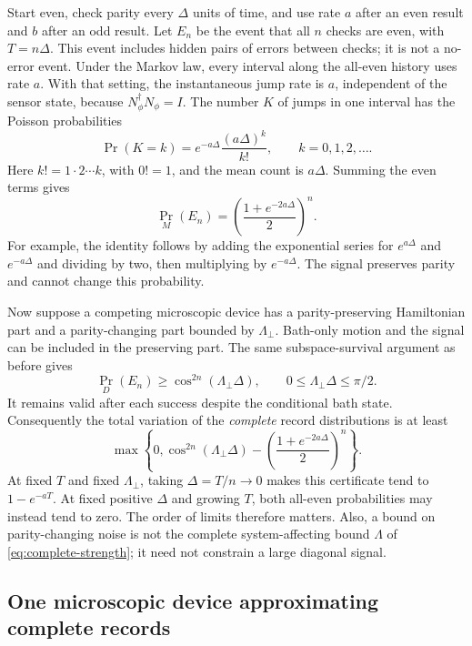 \documentclass[11pt,a4paper]{article}
\numberwithin{equation}{section}
\theoremstyle{remark}
\begin{document}
Start even, check parity every $\Delta$ units of time, and use rate $a$
after an even result and $b$ after an odd result. Let $E_n$ be the event that
all $n$ checks are even, with $T=n\Delta$. This event includes hidden pairs
of errors between checks; it is not a no-error event. Under the Markov law,
every interval along the all-even history uses rate $a$. With that
setting, the instantaneous jump rate is $a$, independent of the sensor state,
because $N_\phi^\dagger N_\phi=I$. The number $K$ of jumps in one
interval has the Poisson probabilities
\begin{equation}
 \Pr(K=k)=e^{-a\Delta}\frac{(a\Delta)^k}{k!},
 \qquad k=0,1,2,\ldots .
\end{equation}
Here $k!=1\cdot2\cdots k$, with $0!=1$, and the mean count is $a\Delta$.
Summing the even terms gives
\begin{equation}
 \Pr_M(E_n)=\left(\frac{1+e^{-2a\Delta}}2\right)^n.
 \label{bridge:even-record}
\end{equation}
For example, the identity follows by adding the exponential series for
$e^{a\Delta}$ and $e^{-a\Delta}$ and dividing by two, then multiplying
by $e^{-a\Delta}$. The signal preserves parity and cannot change this
probability.

Now suppose a competing microscopic device has a parity-preserving
Hamiltonian part and a parity-changing part bounded by $\Lambda_\perp$.
Bath-only motion and the signal can be included in the preserving part.
The same subspace-survival argument as before gives
\begin{equation}
 \Pr_D(E_n)\ge\cos^{2n}(\Lambda_\perp\Delta),
 \qquad 0\le\Lambda_\perp\Delta\le\pi/2.
\end{equation}
It remains valid after each success despite the conditional bath state.
Consequently the total variation of the \emph{complete} record distributions
is at least
\begin{equation}
 \max\left\{0,\cos^{2n}(\Lambda_\perp\Delta)
 -\left(\frac{1+e^{-2a\Delta}}2\right)^n\right\}.
\end{equation}
At fixed $T$ and fixed $\Lambda_\perp$, taking $\Delta=T/n\to0$ makes this
certificate tend to $1-e^{-aT}$. At fixed positive $\Delta$ and growing
$T$, both all-even probabilities may instead tend to zero. The order of
limits therefore matters. Also, a bound on parity-changing noise is not
the complete system-affecting bound $\Lambda$ of
\eqref{eq:complete-strength}; it need not constrain a large diagonal signal.

\subsection{One microscopic device approximating complete records}
\end{document}
